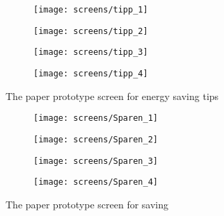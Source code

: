 \begin{figure}[h]
	\centering
	\begin{subfigure}[b]{0.24\columnwidth}
		\centering
		\texttt{[image: screens/tipp\_1]}
		\label{fig:tipps:professional}
	\end{subfigure}
	\begin{subfigure}[b]{0.24\columnwidth}
		\centering
		\texttt{[image: screens/tipp\_2]}
		\label{fig:tipps:optimizer}
	\end{subfigure}
	\begin{subfigure}[b]{0.24\columnwidth}
		\centering
		\texttt{[image: screens/tipp\_3]}
		\label{fig:tipps:indifferent}
	\end{subfigure}
	\begin{subfigure}[b]{0.24\columnwidth}
		\centering
		\texttt{[image: screens/tipp\_4]}
		\label{fig:tipps:hedonist}
	\end{subfigure}
	\caption{The paper prototype screen for energy saving tips}
	\label{fig:tipps} %
\end{figure}

\begin{figure}[h]
	\centering
	\begin{subfigure}[b]{0.24\columnwidth}
		\centering
		\texttt{[image: screens/Sparen\_1]}
		\label{fig:sparen:professional}
	\end{subfigure}
	\begin{subfigure}[b]{0.24\columnwidth}
		\centering
		\texttt{[image: screens/Sparen\_2]}
		\label{fig:sparen:optimizer}
	\end{subfigure}
	\begin{subfigure}[b]{0.24\columnwidth}
		\centering
		\texttt{[image: screens/Sparen\_3]}
		\label{fig:sparen:indifferent}
	\end{subfigure}
	\begin{subfigure}[b]{0.24\columnwidth}
		\centering
		\texttt{[image: screens/Sparen\_4]}
		\label{fig:sparen:hedonist}
	\end{subfigure}
	\caption{The paper prototype screen for saving}
	\label{fig:sparen} %
\end{figure}

